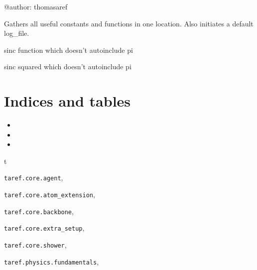 \documentclass[letterpaper,10pt,english]{sphinxmanual}
\begin{document}
@author: thomasaref

Gathers all useful constants and functions in one location. Also initiates a default log\_file.

\begin{fulllineitems}
\label{physics_doc/fundamentals:taref.physics.fundamentals.sinc}
sinc function which doesn't autoinclude pi

\end{fulllineitems}


\begin{fulllineitems}
\label{physics_doc/fundamentals:taref.physics.fundamentals.sinc_sq}
sinc squared which doesn't autoinclude pi

\end{fulllineitems}



\chapter{Indices and tables}
\label{index:indices-and-tables}\begin{itemize}
\item {} 

\item {} 

\item {} 

\end{itemize}


\renewcommand{\indexname}{Python Module Index}
\begin{theindex}
\def\bigletter#1{{\Large\sffamily#1}\nopagebreak\vspace{1mm}}
\bigletter{t}
\item {\texttt{taref.core.agent}}, \pageref{core_doc/agent:module-taref.core.agent}
\item {\texttt{taref.core.atom\_extension}}, \pageref{core_doc/atom_extension:module-taref.core.atom_extension}
\item {\texttt{taref.core.backbone}}, \pageref{core_doc/backbone:module-taref.core.backbone}
\item {\texttt{taref.core.extra\_setup}}, \pageref{core_doc/extra_setup:module-taref.core.extra_setup}
\item {\texttt{taref.core.shower}}, \pageref{core_doc/shower:module-taref.core.shower}
\item {\texttt{taref.physics.fundamentals}}, \pageref{physics_doc/fundamentals:module-taref.physics.fundamentals}
\end{theindex}

\renewcommand{\indexname}{Index}
\printindex
\end{document}
